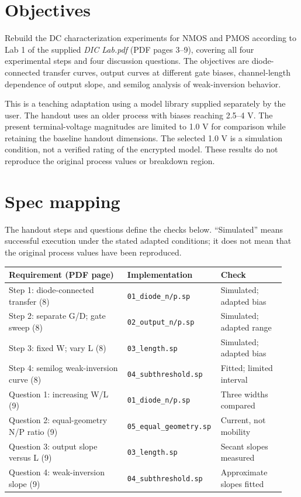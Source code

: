 \section{Objectives}
Rebuild the DC characterization experiments for NMOS and PMOS according to Lab 1 of the supplied \textit{DIC Lab.pdf} (PDF pages 3--9), covering all four experimental steps and four discussion questions. The objectives are diode-connected transfer curves, output curves at different gate biases, channel-length dependence of output slope, and semilog analysis of weak-inversion behavior.

This is a teaching adaptation using a model library supplied separately by the user. The handout uses an older process with biases reaching 2.5--4 V. The present terminal-voltage magnitudes are limited to 1.0 V for comparison while retaining the baseline handout dimensions. The selected 1.0 V is a simulation condition, not a verified rating of the encrypted model. These results do not reproduce the original process values or breakdown region.

\section{Spec mapping}
The handout steps and questions define the checks below. ``Simulated'' means successful execution under the stated adapted conditions; it does not mean that the original process values have been reproduced.
\begin{center}
\setlength{\tabcolsep}{3pt}
\begin{tabular}{p{0.42\linewidth}p{0.29\linewidth}p{0.23\linewidth}}
\toprule
Requirement (PDF page) & Implementation & Check \\
\midrule
Step 1: diode-connected transfer (8) & \texttt{01\_diode\_n/p.sp} & Simulated; adapted bias \\
Step 2: separate G/D; gate sweep (8) & \texttt{02\_output\_n/p.sp} & Simulated; adapted range \\
Step 3: fixed W; vary L (8) & \texttt{03\_length.sp} & Simulated; adapted bias \\
Step 4: semilog weak-inversion curve (8) & \texttt{04\_subthreshold.sp} & Fitted; limited interval \\
Question 1: increasing W/L (9) & \texttt{01\_diode\_n/p.sp} & Three widths compared \\
Question 2: equal-geometry N/P ratio (9) & \texttt{05\_equal\_geometry.sp} & Current, not mobility \\
Question 3: output slope versus L (9) & \texttt{03\_length.sp} & Secant slopes measured \\
Question 4: weak-inversion slope (9) & \texttt{04\_subthreshold.sp} & Approximate slopes fitted \\
\bottomrule
\end{tabular}
\end{center}


